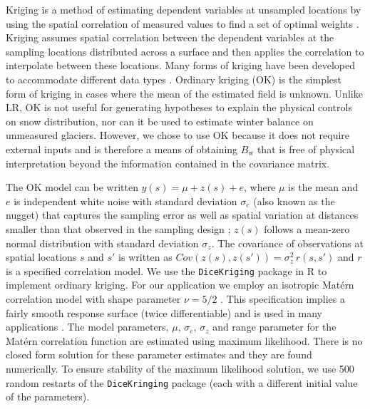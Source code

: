 \documentclass[review,oneside, letterpaper]{igs}
\begin{document}
Kriging is a method of estimating dependent variables at unsampled locations by using the spatial correlation of measured values to find a set of optimal weights \citep{Davis1986, Li2008}. 
Kriging assumes spatial correlation between the dependent variables at the sampling locations distributed across a surface and then applies the correlation to interpolate between these locations. Many forms of kriging have been developed to accommodate different data types \citep[e.g.][and sources therein]{Li2008}. Ordinary kriging (OK) is the simplest form of kriging in cases where the mean of the estimated field is unknown.
Unlike LR, OK is not useful for generating hypotheses to explain the physical controls on snow distribution, nor can it be used to estimate winter balance on unmeasured glaciers. However, we chose to use OK because it does not require external inputs and is therefore a means of obtaining $B_\mathrm{w}$ that is free of physical interpretation beyond the information contained in the covariance matrix.

The OK model can be written $y(s) = \mu + z(s) + e$, where $\mu$ is the mean and $e$ is independent white noise with standard deviation $\sigma_e$ (also known as the nugget) that captures the sampling error as well as spatial variation at distances smaller than that observed in the sampling design \citep{Li2008};
 $z(s)$ follows a mean-zero normal distribution with standard deviation $\sigma_z$. The covariance of observations at spatial locations $s$ and $s'$ is written as $Cov(z(s), z(s')) =\sigma^2_z \, r(s,s')$ and $r$ is a specified correlation model. 
We use the \texttt{DiceKriging} package in R \citep{Roustant2012} to implement ordinary kriging.
For our application we employ an isotropic Mat\'ern correlation model with shape parameter $\nu=5/2$
\citep[see][]{Rasmussen2006}. This specification implies a fairly smooth response surface (twice differentiable) and is used in many applications \citep[e.g.][]{Stein1999}.  
The model parameters, $\mu$, $\sigma_e$, $\sigma_z$ and range parameter for the Mat\'ern correlation function are estimated using maximum likelihood.  There is no closed form solution for these parameter estimates and they are found numerically.  To ensure stability of the maximum likelihood solution, we use 500 random restarts of the \texttt{DiceKringing} package (each with a different initial value of the parameters).


%
\end{document}
